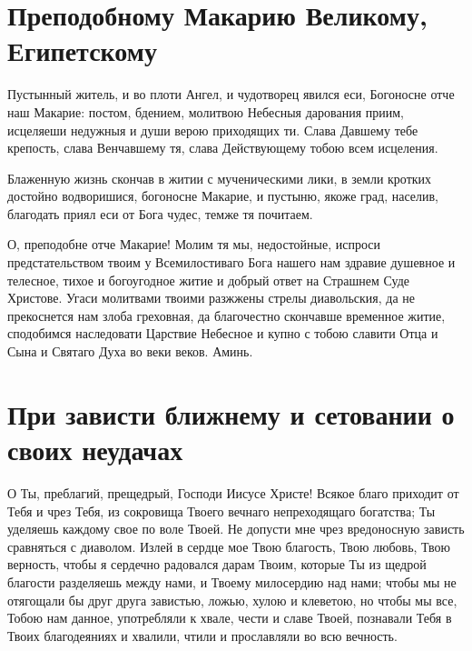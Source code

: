 \section{Преподобному Макарию Великому, Египетскому}\begin{mymulticols}


Пустынный житель, и во плоти Ангел, и чудотворец явился еси, Богоносне отче наш Макарие: постом, бдением, молитвою Небесныя дарования приим, исцеляеши недужныя и души верою приходящих ти. Слава Давшему тебе крепость, слава Венчавшему тя, слава Действующему тобою всем исцеления.


Блаженную жизнь скончав в житии с мученическими лики, в земли кротких достойно водворишися, богоносне Макарие, и пустыню, якоже град, населив, благодать приял еси от Бога чудес, темже тя почитаем.


О, преподобне отче Макарие!  Молим тя мы, недостойные, испроси предстательством твоим у Всемилостиваго Бога нашего нам здравие душевное и телесное, тихое и богоугодное житие  и добрый ответ на Страшнем Суде Христове. Угаси молитвами твоими разжжены стрелы диавольския, да не прекоснется нам злоба греховная, да благочестно скончавше временное житие, сподобимся наследовати Царствие Небесное и купно с тобою славити Отца и Сына и Святаго Духа во веки веков. Аминь.

\end{mymulticols}

\mychapterending


\section{При зависти ближнему и сетовании о своих неудачах}\begin{mymulticols}

О Ты, преблагий, прещедрый, Господи Иисусе Христе! Всякое благо приходит от Тебя и чрез Тебя, из сокровища Твоего вечнаго непреходящаго богатства; Ты уделяешь каждому свое по воле Твоей. Не допусти мне чрез вредоносную зависть сравняться с диаволом. Излей в сердце мое Твою благость, Твою любовь, Твою верность, чтобы я сердечно радовался дарам Твоим, которые Ты из щедрой благости разделяешь между нами, и Твоему милосердию над нами; чтобы мы не отягощали бы друг друга завистью, ложью, хулою и клеветою, но чтобы мы все, Тобою нам данное, употребляли к хвале, чести и славе Твоей, познавали Тебя в Твоих благодеяниях и хвалили, чтили и прославляли во всю вечность.

\end{mymulticols}

